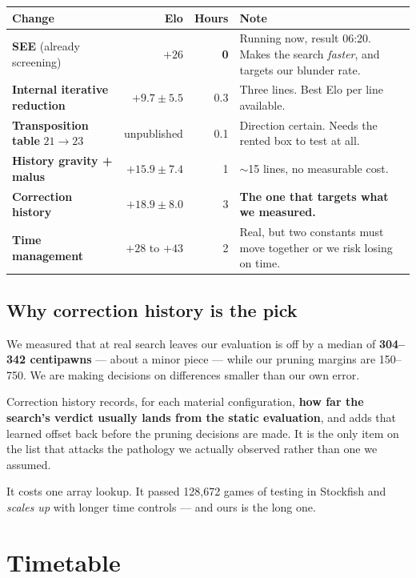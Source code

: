 \documentclass[11pt,a4paper]{article}
\newcommand{\good}[1]{\textcolor{teal!70!black}{\textbf{#1}}}
\begin{document}
\begin{center}
\begin{longtable}{p{4.6cm}rrp{5.4cm}}
\toprule
Change & Elo & Hours & Note \\
\midrule\endhead
\textbf{SEE} (already screening) & $+26$ & \good{0} & Running now, result 06:20. Makes the search
\emph{faster}, and targets our blunder rate. \\
\addlinespace
\textbf{Internal iterative reduction} & $+9.7 \pm 5.5$ & 0.3 & Three lines. Best Elo per line
available. \\
\addlinespace
\textbf{Transposition table} $21\to23$ & unpublished & 0.1 & Direction certain. Needs the rented
box to test at all. \\
\addlinespace
\textbf{History gravity + malus} & $+15.9 \pm 7.4$ & 1 & $\sim$15 lines, no measurable cost. \\
\addlinespace
\textbf{Correction history} & $+18.9 \pm 8.0$ & 3 & \textbf{The one that targets what we
measured.} \\
\addlinespace
\textbf{Time management} & $+28$ to $+43$ & 2 & Real, but two constants must move together or we
risk losing on time. \\
\bottomrule
\end{longtable}
\end{center}

\subsection{Why correction history is the pick}

We measured that at real search leaves our evaluation is off by a median of \textbf{304--342
centipawns} --- about a minor piece --- while our pruning margins are 150--750. We are making
decisions on differences smaller than our own error.

Correction history records, for each material configuration, \textbf{how far the search's verdict
usually lands from the static evaluation}, and adds that learned offset back before the pruning
decisions are made. It is the only item on the list that attacks the pathology we actually
observed rather than one we assumed.

It costs one array lookup. It passed 128{,}672 games of testing in Stockfish and \emph{scales up}
with longer time controls --- and ours is the long one.

\section{Timetable}
\end{document}

